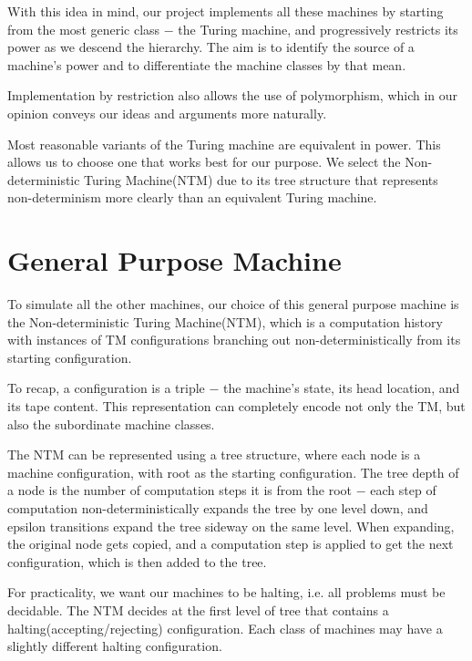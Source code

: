 \documentclass[12pt]{article}  %
\begin{document}
With this idea in mind, our project implements all these machines by starting from the most generic class $-$ the Turing machine, and progressively restricts its power as we descend the hierarchy. The aim is to identify the source of a machine's power and to differentiate the machine classes by that mean.

Implementation by restriction also allows the use of polymorphism, which in our opinion conveys our ideas and arguments more naturally.

Most reasonable variants of the Turing machine are equivalent in power. This allows us to choose one that works best for our purpose. We select the Non-deterministic Turing Machine(NTM) due to its tree structure that represents non-determinism more clearly than an equivalent Turing machine.







\section{General Purpose Machine} \label{NTM}

To simulate all the other machines, our choice of this general purpose machine is the Non-deterministic Turing Machine(NTM), which is a computation history with instances of TM configurations branching out non-deterministically from its starting configuration. 

To recap, a configuration is a triple $-$ the machine's state, its head location, and its tape content. This representation can completely encode not only the TM, but also the subordinate machine classes.

The NTM can be represented using a tree structure, where each node is a machine configuration, with root as the starting configuration. The tree depth of a node is the number of computation steps it is from the root $-$ each step of computation non-deterministically expands the tree by one level down, and epsilon transitions expand the tree sideway on the same level. When expanding, the original node gets copied, and a computation step is applied to get the next configuration, which is then added to the tree.

For practicality, we want our machines to be halting, i.e. all problems must be decidable. The NTM decides at the first level of tree that contains a halting(accepting/rejecting) configuration. Each class of machines may have a slightly different halting configuration.
\end{document}
